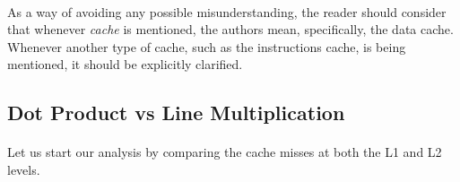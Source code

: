 \documentclass{report}
\begin{document}
			\paragraph{}As a way of avoiding any possible misunderstanding, the reader should consider that whenever \emph{cache} is mentioned, the authors mean, specifically, the data cache. Whenever another type of cache, such as the instructions cache, is being mentioned, it should be explicitly clarified.
		
			\subsection{Dot Product vs Line Multiplication}
			
				\paragraph{}Let us start our analysis by comparing the cache misses at both the L1 and L2 levels.
			
\end{document}
